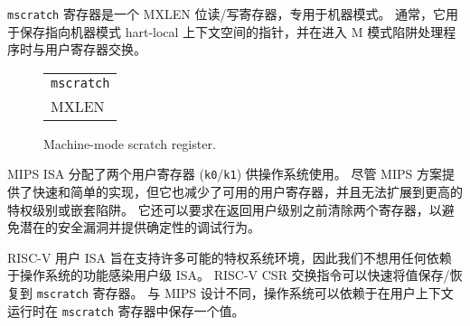 \iffalse
The {\tt mscratch} register is an MXLEN-bit read/write register
dedicated for use by machine mode.  Typically, it is used to hold a
pointer to a machine-mode hart-local context space and swapped with a
user register upon entry to an M-mode trap handler.
\fi
{\tt mscratch} 寄存器是一个 MXLEN 位读/写寄存器，专用于机器模式。 通常，它用于保存指向机器模式 hart-local 上下文空间的指针，并在进入 M 模式陷阱处理程序时与用户寄存器交换。

\begin{figure}[h!]
{\footnotesize
\begin{center}
\begin{tabular}{@{}J}
 \\
\hline
{} \\
\hline
MXLEN \\
\end{tabular}
\end{center}
}
\vspace{-0.1in}
\caption{Machine-mode scratch register.}
\label{mscratchreg}
\end{figure}

\iffalse
\begin{commentary}
The MIPS ISA allocated two user registers ({\tt k0}/{\tt k1}) for use
by the operating system.  Although the MIPS scheme provides a fast and
simple implementation, it also reduces available user registers,  and
does not scale to further privilege levels, or nested traps.  It can
also require both registers are cleared before returning to user level
to avoid a potential security hole and to provide deterministic
debugging behavior.

The RISC-V user ISA was designed to support many possible privileged
system environments and so we did not want to infect the user-level
ISA with any OS-dependent features.  The RISC-V CSR swap instructions
can quickly save/restore values to the {\tt mscratch} register.
Unlike the MIPS design, the OS can rely on holding a value in the {\tt
  mscratch} register while the user context is running.
\end{commentary}
\fi

\begin{commentary}
MIPS ISA 分配了两个用户寄存器 ({\tt k0}/{\tt k1}) 供操作系统使用。 尽管 MIPS 方案提供了快速和简单的实现，但它也减少了可用的用户寄存器，并且无法扩展到更高的特权级别或嵌套陷阱。 它还可以要求在返回用户级别之前清除两个寄存器，以避免潜在的安全漏洞并提供确定性的调试行为。

RISC-V 用户 ISA 旨在支持许多可能的特权系统环境，因此我们不想用任何依赖于操作系统的功能感染用户级 ISA。 RISC-V CSR 交换指令可以快速将值保存/恢复到 {\tt mscratch} 寄存器。 与 MIPS 设计不同，操作系统可以依赖于在用户上下文运行时在 {\tt mscratch} 寄存器中保存一个值。
\end{commentary}


